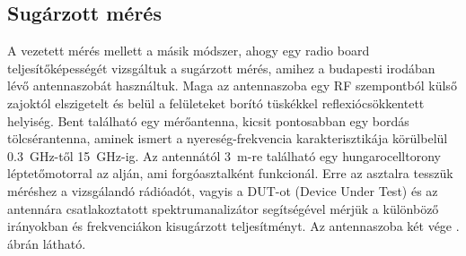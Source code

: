 \documentclass[a4paper,12pt,titlepage]{article}
\begin{document}
        \subsection{Sugárzott mérés}
            A vezetett mérés mellett a másik módszer, ahogy egy radio board teljesítőképességét vizsgáltuk a sugárzott mérés, amihez a budapesti irodában lévő antennaszobát használtuk. Maga az antennaszoba egy RF szempontból külső zajoktól elszigetelt és belül a felületeket borító tüskékkel reflexiócsökkentett helyiség. Bent található egy mérőantenna, kicsit pontosabban egy bordás tölcsérantenna, aminek ismert a nyereség-frekvencia karakterisztikája körülbelül \SI{0,3}{GHz}-től \SI{15}{GHz}-ig. Az antennától \SI{3}{m}-re található egy hungarocelltorony léptetőmotorral az alján, ami forgóasztalként funkcionál. Erre az asztalra tesszük méréshez a vizsgálandó rádióadót, vagyis a DUT-ot (Device Under Test) és az antennára csatlakoztatott spektrumanalizátor segítségével mérjük a különböző irányokban és frekvenciákon kisugárzott teljesítményt. Az antennaszoba két vége . ábrán látható.
\end{document}
